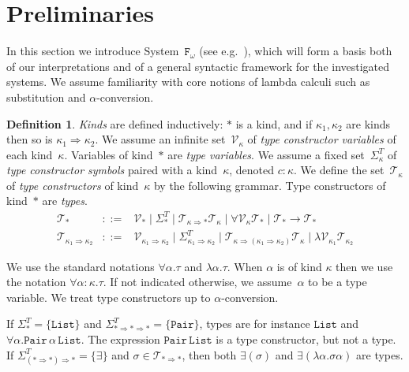 \documentclass[a4paper,UKenglish,cleveref,autoref,numberwithinsect]{lipics-v2019}
\theoremstyle{definition}
\newtheorem{defn}[theorem]{Definition}
\newcommand{\Fomega}{\mathtt{F}_\omega}
\newcommand{\arrkind}{\Rightarrow}
\newcommand{\arrtype}{\rightarrow}
\newcommand{\Tc}{\mathcal{T}}
\newcommand{\Vc}{\mathcal{V}}
\newcommand{\List}{\mathtt{List}}
\newcommand{\Pair}{\mathtt{Pair}}
\begin{document}
\section{Preliminaries}\label{sec_preliminaries}

In this section we introduce System~$\Fomega$ (see
e.g.~\cite[Section~11.7]{SorensenUrzyczyn2006}), which will form a
basis both of our interpretations and of a general syntactic framework
for the investigated systems. We assume familiarity with core notions
of lambda calculi such as substitution and $\alpha$-conversion.

\begin{defn}\label{def_types}
  \emph{Kinds} are defined inductively: $*$ is a kind, and if
  $\kappa_1,\kappa_2$ are kinds then so is $\kappa_1 \arrkind
  \kappa_2$. We assume an infinite set~$\Vc_\kappa$ of \emph{type
    constructor variables} of each kind~$\kappa$. Variables of
  kind~$*$ are \emph{type variables}. We assume a fixed
  set~$\Sigma^T_\kappa$ of \emph{type constructor symbols} paired with a
  kind~$\kappa$, denoted $c : \kappa$.
  We define the set~$\Tc_\kappa$ of \emph{type constructors} of
  kind~$\kappa$ by the following grammar.
  Type constructors of kind~$*$ are \emph{types}.
  \[
  \begin{array}{rcl}
    \Tc_{*} &::=& \Vc_{*}
    \mid \Sigma^T_{*} \mid
    \Tc_{\kappa\arrkind *}\Tc_{\kappa} \mid \forall\Vc_\kappa\Tc_* \mid \Tc_*\arrtype\Tc_* \\
    \Tc_{\kappa_1\arrkind\kappa_2} &::=& \Vc_{\kappa_1\arrkind\kappa_2}
    \mid \Sigma^T_{\kappa_1\arrkind\kappa_2} \mid
    \Tc_{\kappa\arrkind(\kappa_1\arrkind\kappa_2)}\Tc_{\kappa} \mid \lambda \Vc_{\kappa_1} \Tc_{\kappa_2}
  \end{array}
  \]

  We use the standard notations $\forall \alpha . \tau$ and $\lambda
  \alpha . \tau$. When $\alpha$ is of kind $\kappa$ then we use the
  notation $\forall \alpha : \kappa . \tau$. If not indicated
  otherwise, we assume~$\alpha$ to be a type variable. We treat type
  constructors up to $\alpha$-conversion.

  \begin{example}
  If $\Sigma^T_{*} = \{ \List \}$ and $\Sigma^T_{* \arrkind * \arrkind
  *} = \{ \Pair \}$, types are for instance $\List$ and
  $\forall \alpha.\Pair\,\alpha\,\List$.  The expression
  $\Pair\,\List$ is a type constructor, but not a type.  If
  $\Sigma^T_{(* \arrkind *) \arrkind *} = \{ \exists \}$ and
  $\sigma \in \Tc_{* \arrkind *}$, then both
  $\exists(\sigma)$ and $\exists (\lambda \alpha.\sigma\alpha)$ are
  types.
  \end{example}


\end{defn}
\end{document}
